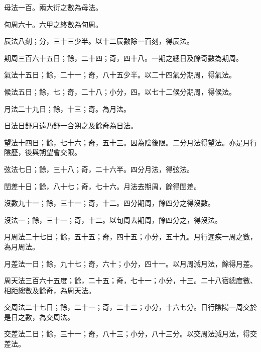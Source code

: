 \begin{pinyinscope}
 母法一百。兩大衍之數為母法。



 旬周六十。六甲之終數為旬周。



 辰法八刻；分，三十三少半。以十二辰數除一百刻，得辰法。



 期周三百六十五日；餘，二十四；奇，四十八。一期之總日及餘奇數為期周。



 氣法十五日；餘，二十一；奇，八十五少半。以二十四氣分期周，得氣法。



 候法五日；餘，七；奇，二十八；小分，四。以七十二候分期周，得候法。



 月法二十九日；餘，十三；奇。為月法。



 日法日舒月遠乃舒一合朔之及餘奇為日法。



 望法十四日；餘，七十六；奇，五十三。因為陰後限。二分月法得望法。亦是月行陰歷，後與朔望會交限。



 弦法七日；餘，三十八；奇，二十六半。四分月法，得弦法。



 閏差十日；餘，八十七；奇，七十六。月法去期周，餘得閏差。



 沒數九十一；餘，三十一；奇，十二。四分期周，餘四分之得沒數。



 沒法一；餘，三十一；奇，十二。以旬周去期周，餘四分之，得沒法。



 月周法二十七日；餘，五十五；奇，四十五；小分，五十九。月行遲疾一周之數，為月周法。



 月差法一日；餘，九十七；奇，六十；小分，四十一。以月周減月法，餘得月差。



 周天法三百六十五度；餘，二十五；奇，七十一；小分，十三。二十八宿總度數、相距總數及餘奇，為周天法。



 交周法二十七日；餘，二十一；奇，二十二；小分，十六七分。日行陰陽一周交於是日之數，為交周法。



 交差法二日；餘，三十一；奇，八十三；小分，八十三分。以交周法減月法，得交差法。




\end{pinyinscope}
